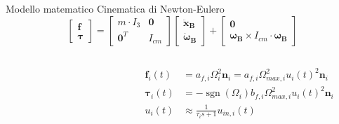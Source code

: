 \documentclass[]{beamer}
\DeclareMathOperator*{\sgn}{sgn}                %
\begin{document}
	\begin{frame}{Modello matematico}
		\centering
		Cinematica di Newton-Eulero
		\begin{equation*}
			\begin{bmatrix}
				\mathbf{f}        \\
				\boldsymbol{\tau}
			\end{bmatrix}
			=
			\begin{bmatrix}
				m \cdot I_{3} & \mathbf{0} \\
				\mathbf{0}^T          & I_{cm}
			\end{bmatrix}
			\begin{bmatrix}
				\mathbf{\ddot{x}_B}         \\
				\boldsymbol{\dot{\omega}_B}
			\end{bmatrix}
			+
			\begin{bmatrix}
				\mathbf{0}                                                      \\
				\boldsymbol{\omega_B} \times I_{cm} \cdot \boldsymbol{\omega_B}
			\end{bmatrix}
		\end{equation*}
		\begin{columns}
			\begin{column}{.55\textwidth}
				\centering
				\begin{figure}
					
				\end{figure}
			\end{column}
			\begin{column}{.55\textwidth}
				\centering
				\begin{align*}
					\mathbf{f}_i(t) &= a_{f,i}\Omega_i^2\mathbf{n}_i = a_{f,i}\Omega_{max, i}^2 u_i(t)^2\mathbf{n}_i \\
					\boldsymbol{\tau}_i(t) &= -\sgn(\Omega_i)b_{f,i}\Omega_{max,i}^2u_i(t)^2\mathbf{n}_i \\
					u_i(t) &\approx \frac{1}{\tau_i s+1}u_{in,i}(t)
				\end{align*}
			\end{column}
		\end{columns}
	\end{frame}
	
\end{document}
